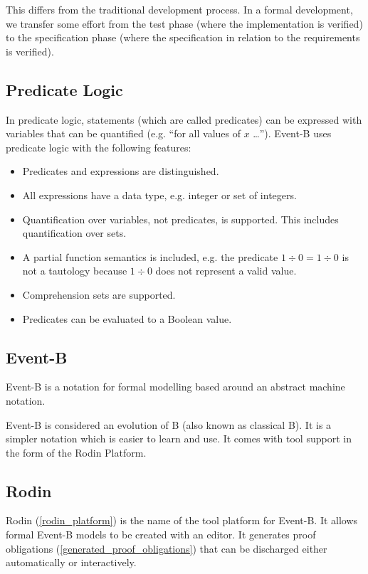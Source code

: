 This differs from the traditional development process. In a formal development, we transfer some effort from the test phase (where the implementation is verified) to the specification phase (where the specification in relation to the requirements is verified).

\subsection{Predicate Logic}
\label{tut_predicate_logic}

In predicate logic, statements (which are called predicates) can be expressed with variables
  that can be quantified (e.g. ``for all values of $x$ \ldots'').
Event-B uses predicate logic with the following features:
\begin{itemize}
\item Predicates and expressions are distinguished.
\item All expressions have a data type, e.g. integer or set of integers.
\item Quantification over variables, not predicates, is supported.
  This includes quantification over sets.
\item A partial function semantics is included, e.g. the predicate $1\div 0 = 1\div 0$ is not
  a tautology because $1\div 0$ does not represent a valid value.
\item Comprehension sets are supported.
\item Predicates can be evaluated to a Boolean value.
\end{itemize}

\subsection{Event-B}
\label{tut_eventb}

Event-B is a notation for formal modelling based around an abstract machine notation. 

Event-B is considered an evolution of B (also known as classical B). It is a simpler notation which is easier to learn and use. It comes with tool support in the form of the Rodin Platform.

\subsection{Rodin}
\label{tut_rodin}

Rodin (\ref{rodin_platform}) is the name of the tool platform for Event-B.  It allows formal Event-B models to be created with an editor.  It generates proof obligations (\ref{generated_proof_obligations}) that can be discharged either automatically or interactively.


